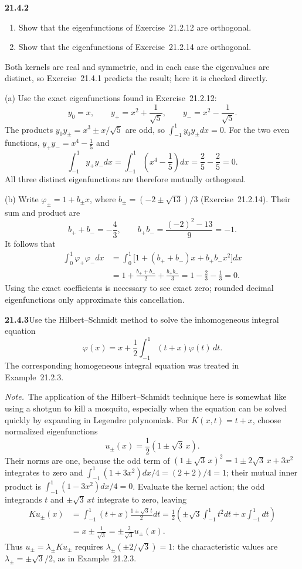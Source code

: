 \par\bigskip
\noindent\textbf{21.4.2}
\begin{enumerate}
\item[(a)] Show that the eigenfunctions of Exercise~21.2.12 are
orthogonal.
\item[(b)] Show that the eigenfunctions of Exercise~21.2.14 are
orthogonal.
\end{enumerate}
\solution
Both kernels are real and symmetric, and in each case the eigenvalues
are distinct, so Exercise~21.4.1 predicts the result; here it is
checked directly.

(a) Use the exact eigenfunctions found in Exercise~21.2.12:
\[
y_0=x,\qquad y_+=x^2+\frac1{\sqrt5},\qquad
y_-=x^2-\frac1{\sqrt5}.
\]
The products $y_0y_\pm=x^3\pm x/\sqrt5$ are odd, so
$\int_{-1}^1y_0y_\pm dx=0$. For the two
even functions, $y_+y_-=x^4-\frac15$ and
\[
\int_{-1}^1y_+y_-dx
=\int_{-1}^1\left(x^4-\frac15\right)dx
=\frac25-\frac25=0.
\]
All three distinct eigenfunctions are therefore mutually orthogonal.

(b) Write $\varphi_\pm=1+b_\pm x$, where
$b_\pm=(-2\pm\sqrt{13})/3$ (Exercise~21.2.14). Their sum and product are
\[
b_++b_-=-\frac43,\qquad b_+b_-=\frac{(-2)^2-13}{9}=-1.
\]
It follows that
\[
\begin{aligned}
\int_0^1\varphi_+\varphi_-dx
&=\int_0^1\bigl[1+(b_++b_-)x+b_+b_-x^2\bigr]dx\\
&=1+\frac{b_++b_-}{2}+\frac{b_+b_-}{3}
=1-\frac23-\frac13=\boxed{0}.
\end{aligned}
\]
Using the exact coefficients is necessary to see exact zero;
rounded decimal eigenfunctions only approximate this cancellation.


\par\bigskip
\noindent\textbf{21.4.3}\quad Use the Hilbert--Schmidt method to
solve the inhomogeneous integral equation
\[
\varphi(x)=x+\frac{1}{2}\int_{-1}^{1}(t+x)\varphi(t)\,dt.
\]
The corresponding homogeneous integral equation was treated in
Example~21.2.3.
\par\emph{Note.}~The application of the Hilbert--Schmidt
technique here is somewhat like using a shotgun to kill a
mosquito, especially when the equation can be solved quickly by
expanding in Legendre polynomials.
\solution
For $K(x,t)=t+x$, choose normalized eigenfunctions
\[
u_\pm(x)=\frac12(1\pm\sqrt3\,x).
\]
Their norms are one, because the odd term of
$(1\pm\sqrt3\,x)^2=1\pm2\sqrt3\,x+3x^2$ integrates to zero and
$\int_{-1}^1(1+3x^2)dx/4=(2+2)/4=1$; their mutual inner product is
$\int_{-1}^1(1-3x^2)dx/4=0$. Evaluate the kernel action; the odd
integrands $t$ and $\pm\sqrt3\,xt$ integrate to zero, leaving
\[
\begin{aligned}
Ku_\pm(x)
&=\int_{-1}^1(t+x)\frac{1\pm\sqrt3\,t}{2}dt
=\frac12\left(\pm\sqrt3\int_{-1}^1t^2dt+x\int_{-1}^1dt\right)\\
&=x\pm\frac1{\sqrt3}
=\pm\frac2{\sqrt3}u_\pm(x).
\end{aligned}
\]
Thus $u_\pm=\lambda_\pm Ku_\pm$ requires $\lambda_\pm(\pm2/\sqrt3)=1$:
the characteristic values are
$\lambda_\pm=\pm\sqrt3/2$, as in Example~21.2.3.

